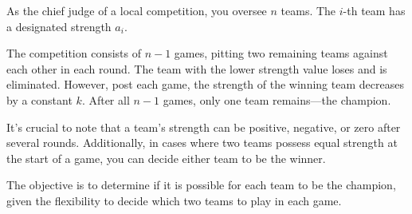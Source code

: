 As the chief judge of a local competition,
you oversee $n$ teams. The $i$-th team has a designated strength $a_i$.

The competition consists of $n - 1$ games, pitting two remaining teams against each other in each round.
The team with the lower strength value loses and is eliminated.
However, post each game, the strength of the winning team decreases by a constant $k$.
After all $n - 1$ games, only one team remains—the champion.

It's crucial to note that a team's strength can be positive, negative, or zero after several rounds.
Additionally, in cases where two teams possess equal strength at the start of a game, 
you can decide either team to be the winner.

The objective is to determine if it is possible for each team to be the champion, given the flexibility to decide which two teams to play in each game.